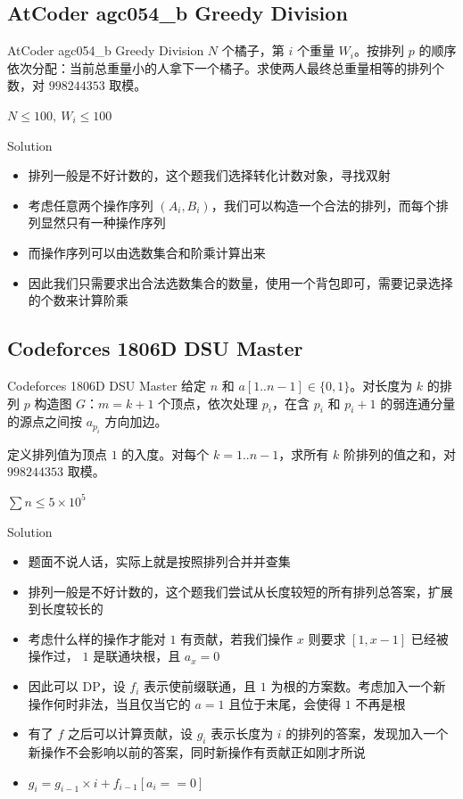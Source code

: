 ﻿\documentclass[aspectratio=169]{ctexbeamer}
\begin{document}
\subsection{AtCoder agc054\_b Greedy Division}
\begin{frame}{AtCoder agc054\_b Greedy Division}
    $N$ 个橘子，第 $i$ 个重量 $W_i$。按排列 $p$ 的顺序依次分配：当前总重量小的人拿下一个橘子。求使两人最终总重量相等的排列个数，对 $998244353$ 取模。
    
    $N\le 100,\ W_i\le 100$
\end{frame}

\begin{frame}{Solution}
    \begin{itemize}
        \item 排列一般是不好计数的，这个题我们选择转化计数对象，寻找双射
        \item 考虑任意两个操作序列 $(A_i,B_i)$，我们可以构造一个合法的排列，而每个排列显然只有一种操作序列
        \item 而操作序列可以由选数集合和阶乘计算出来
        \item 因此我们只需要求出合法选数集合的数量，使用一个背包即可，需要记录选择的个数来计算阶乘
    \end{itemize}
\end{frame}

\subsection{Codeforces 1806D DSU Master}
\begin{frame}{Codeforces 1806D DSU Master}
    给定 $n$ 和 $a[1..n-1]\in\{0,1\}$。对长度为 $k$ 的排列 $p$ 构造图 $G$：$m=k+1$ 个顶点，依次处理 $p_i$，在含 $p_i$ 和 $p_i+1$ 的弱连通分量的源点之间按 $a_{p_i}$ 方向加边。
    
    定义排列值为顶点 $1$ 的入度。对每个 $k=1..n-1$，求所有 $k$ 阶排列的值之和，对 $998244353$ 取模。
    
    $\sum n\le 5\times10^5$
\end{frame}

\begin{frame}{Solution}
    \begin{itemize}
        \item 题面不说人话，实际上就是按照排列合并并查集
        \item 排列一般是不好计数的，这个题我们尝试从长度较短的所有排列总答案，扩展到长度较长的
        \item 考虑什么样的操作才能对 $ 1 $ 有贡献，若我们操作 $x$ 则要求 $[1,x-1]$ 已经被操作过， $1$ 是联通块根，且 $a_x=0$
        \item 因此可以 DP，设 $f_i$ 表示使前缀联通，且 $1$ 为根的方案数。考虑加入一个新操作何时非法，当且仅当它的 $a=1$ 且位于末尾，会使得 $1$ 不再是根
        \item 有了 $f$ 之后可以计算贡献，设 $g_i$ 表示长度为 $i$ 的排列的答案，发现加入一个新操作不会影响以前的答案，同时新操作有贡献正如刚才所说
        \item $g_i=g_{i-1}\times i+f_{i-1}[a_i==0]$
    \end{itemize}    
\end{frame}
\end{document}
